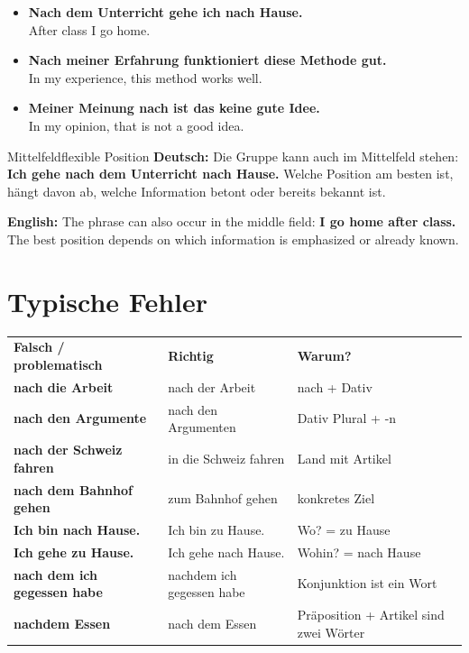 \documentclass[a4paper,11pt]{article}
\newcommand{\GermanText}[1]{\textbf{Deutsch: }#1\par}
\newcommand{\EnglishText}[1]{{\small\color{SoftGray}\textbf{English: }#1\par}}
\newcommand{\ExampleItem}[2]{\item \textbf{#1}\\{\small\color{SoftGray}#2}}
\begin{document}
        \begin{exbox}
            \begin{itemize}
                \ExampleItem{Nach dem Unterricht gehe ich nach Hause.}{After class I go home.}
                \ExampleItem{Nach meiner Erfahrung funktioniert diese Methode gut.}{In my experience, this method works well.}
                \ExampleItem{Meiner Meinung nach ist das keine gute Idee.}{In my opinion, that is not a good idea.}
            \end{itemize}
        \end{exbox}

        \begin{grammarentry}{Mittelfeld}{flexible Position}
            \GermanText{Die Gruppe kann auch im Mittelfeld stehen: \textbf{Ich gehe nach dem Unterricht nach Hause.} Welche Position am besten ist, hängt davon ab, welche Information betont oder bereits bekannt ist.}
            \EnglishText{The phrase can also occur in the middle field: \textbf{I go home after class.} The best position depends on which information is emphasized or already known.}
        \end{grammarentry}


    \section{Typische Fehler}

        \begin{longtable}{>{\bfseries}p{5.0cm}|p{5.0cm}|p{4.2cm}}
            \rowcolor{HeaderBlueDark}
            \color{white}\textbf{Falsch / problematisch} &
            \color{white}\textbf{Richtig} &
            \color{white}\textbf{Warum?} \\
            nach die Arbeit & nach der Arbeit & nach + Dativ \\
            nach den Argumente & nach den Argumenten & Dativ Plural + -n \\
            nach der Schweiz fahren & in die Schweiz fahren & Land mit Artikel \\
            nach dem Bahnhof gehen & zum Bahnhof gehen & konkretes Ziel \\
            Ich bin nach Hause. & Ich bin zu Hause. & Wo? = zu Hause \\
            Ich gehe zu Hause. & Ich gehe nach Hause. & Wohin? = nach Hause \\
            nach dem ich gegessen habe & nachdem ich gegessen habe & Konjunktion ist ein Wort \\
            nachdem Essen & nach dem Essen & Präposition + Artikel sind zwei Wörter \\
        \end{longtable}
\end{document}
